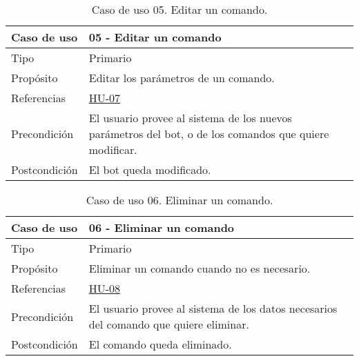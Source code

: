 \begin{table}[H]
    \centering
    \def\arraystretch{1.25}
    \begin{adjustbox}{max width=\textwidth}
    \begin{tabularx}{\textwidth}{|l|L|}
    \hline
        \textbf{Caso de uso} & \textbf{05 - Editar un comando} \\ \hline
    \hline
        Tipo & Primario \\ \hline
        Propósito & Editar los parámetros de un comando. \\ \hline
        Referencias & \hyperref[sec:hu07]{HU-07} \\ \hline
        Precondición & El usuario provee al sistema de los nuevos parámetros del bot, o de los comandos que quiere modificar. \\ \hline
        Postcondición & El bot queda modificado. \\ \hline
    \end{tabularx}
    \end{adjustbox}
    \caption{Caso de uso 05. Editar un comando.}
\end{table}

\begin{table}[H]
    \centering
    \def\arraystretch{1.25}
    \begin{adjustbox}{max width=\textwidth}
    \begin{tabularx}{\textwidth}{|l|L|}
    \hline
        \textbf{Caso de uso} & \textbf{06 - Eliminar un comando} \\ \hline
    \hline
        Tipo & Primario \\ \hline
        Propósito & Eliminar un comando cuando no es necesario. \\ \hline
        Referencias & \hyperref[sec:hu08]{HU-08} \\ \hline
        Precondición & El usuario provee al sistema de los datos necesarios del comando que quiere eliminar. \\ \hline
        Postcondición & El comando queda eliminado. \\ \hline
    \end{tabularx}
    \end{adjustbox}
    \caption{Caso de uso 06. Eliminar un comando.}
\end{table}

